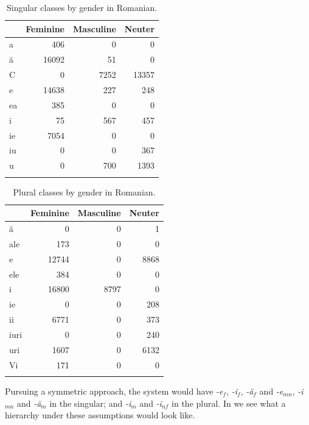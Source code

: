 \begin{table}[!htpb]
  \centering
  \begin{tabular}{lrrr}
    \lsptoprule
    & Feminine & Masculine & Neuter \\
    \midrule
    a  & 406     & 0        & 0      \\
    ă  & 16092   & 51       & 0      \\
    C  & 0       & 7252     & 13357  \\
    e  & 14638   & 227      & 248    \\
    ea & 385     & 0        & 0      \\
    i  & 75      & 567      & 457    \\
    ie & 7054    & 0        & 0      \\
    iu & 0       & 0        & 367    \\
    u  & 0       & 700      & 1393   \\
    \lspbottomrule
  \end{tabular}
  \caption{Singular classes by gender in Romanian.}\label{tab:sing-rom-gender}
\end{table}

\begin{table}[!htpb]
  \centering
  \begin{tabular}{lrrr}
    \lsptoprule
    & Feminine & Masculine & Neuter \\
    \midrule
    ă    & 0       & 0        & 1      \\
    ale  & 173     & 0        & 0      \\
    e    & 12744   & 0        & 8868   \\
    ele  & 384     & 0        & 0      \\
    i    & 16800   & 8797     & 0      \\
    ie   & 0       & 0        & 208    \\
    ii   & 6771    & 0        & 373    \\
    iuri & 0       & 0        & 240    \\
    uri  & 1607    & 0        & 6132   \\
    Vi   & 171     & 0        & 0      \\
    \lspbottomrule
  \end{tabular}
  \caption{Plural classes by gender in Romanian.}\label{tab:plur-rom-gender}
\end{table}

Pursuing a symmetric approach, the system would have \textit{-e}$_{f}$, \textit{-i}$_{f}$, \textit{-ă}$_{f}$ and \textit{-e}$_{mn}$, \textit{-i}$_{mn}$ and \textit{-ă}$_{m}$ in the singular; and \textit{-i}$_{m}$ and \textit{-i}$_{nf}$ in the plural. In   we see what a hierarchy under these assumptions would look like.


